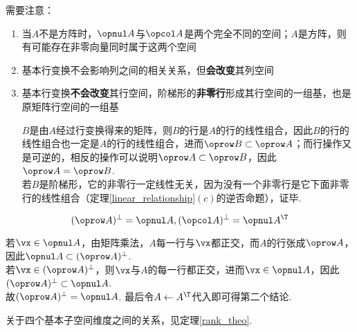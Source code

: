 需要注意：
\begin{enumerate}
	\item 当$A$不是方阵时，$\opnul  A$与$\opcol A$是两个完全不同的空间；$A$是方阵，则有可能存在非零向量同时属于这两个空间
	\item 基本行变换不会影响列之间的相关关系，但\textbf{会改变}其列空间
	\item 基本行变换\textbf{不会改变}其行空间，阶梯形的\textbf{非零行}形成其行空间的一组基，也是原矩阵行空间的一组基
\begin{analysis}
$B$是由$A$经过行变换得来的矩阵，则$B$的行是$A$的行的线性组合，因此$B$的行的线性组合也一定是$A$的行的线性组合，进而$\oprow B\subset\oprow A$；而行操作又是可逆的，相反的操作可以说明$\oprow A\subset\oprow B$，因此$\oprow A=\oprow B$.\\
若$B$是阶梯形，它的非零行一定线性无关，因为没有一个非零行是它下面非零行的线性组合（定理\ref{linear_relationship}$(c)$的逆否命题），证毕.
\end{analysis}
\end{enumerate}
\begin{theorem}
\[(\oprow A)^{\perp}=\opnul A,(\opcol A)^{\perp}=\opnul A^\T \]
\end{theorem}
\begin{analysis}
若$\vx\in\opnul A$，由矩阵乘法，$A$每一行与$\vx$都正交，而$A$的行张成$\oprow A$，因此$\opnul A\subset(\oprow A)^{\perp}$.\\
若$\vx\in(\oprow A)^\perp$，则$\vx$与$A$的每一行都正交，进而$\vx\in\opnul A$，因此$(\oprow A)^{\perp}\subset\opnul A$.\\
故$(\oprow A)^{\perp}=\opnul A$. 最后令$A\gets A^\T $代入即可得第二个结论.
\end{analysis}
\par 关于四个基本子空间维度之间的关系，见定理\ref{rank_theo}.

